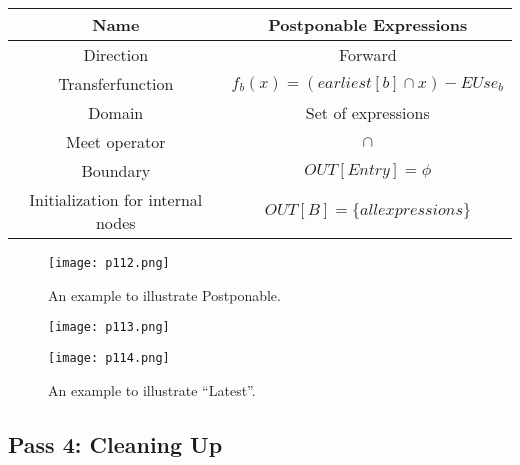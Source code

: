 \begin{center}
	\begin{tabular}{|c|c|}
		\hline Name                              & Postponable Expressions                       \\
		\hline Direction                         & Forward                                       \\
		\hline Transferfunction                  & \( f_b (x) = (earliest[b] \cap x) - EUse_b \) \\
		\hline Domain                            & Set of expressions                            \\
		\hline Meet operator                     & \( \cap \)                                    \\
		\hline Boundary                          & $OUT[Entry] = \phi$                           \\
		\hline Initialization for internal nodes & \( OUT[B] = \{ all expressions\} \)           \\
		\hline
	\end{tabular}
\end{center}


\begin{figure}[H]
	\centering
	\texttt{[image: p112.png]}
	\caption{An example to illustrate Postponable.}
	\label{fig:p112}
\end{figure}

\begin{figure}[H]
	\centering
	\texttt{[image: p113.png]}
	\label{fig:p113}
\end{figure}



\begin{figure}[H]
	\centering
	\texttt{[image: p114.png]}
	\caption{An example to illustrate “Latest”.}
	\label{fig:p114}
\end{figure}

\subsection{Pass 4: Cleaning Up}



